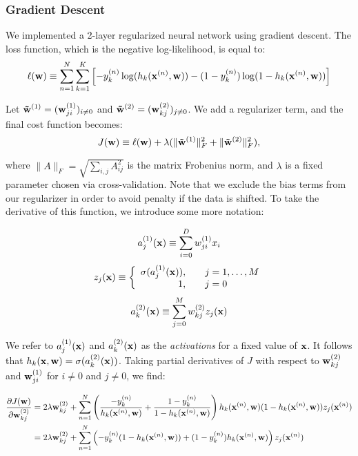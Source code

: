 \subsubsection{Gradient Descent}
We implemented a 2-layer regularized neural network using gradient descent.  The loss function, which is the negative log-likelihood, is equal to:
\begin{equation}
\ell(\boldsymbol{\mathbf{w}}) \equiv \sum_{n=1}^{N} \sum_{k=1}^{K} \left[ -y_k^{(n)} \log(h_{k}(\boldsymbol{\mathbf{x}}^{(n)}, \boldsymbol{\mathbf{w}})) - (1-y_k^{(n)}) \log(1 - h_{k}(\boldsymbol{\mathbf{x}}^{(n)}, \boldsymbol{\mathbf{w}}))\right]
\end{equation}

Let $\boldsymbol{\mathbf{\tilde w}}^{(1)} = (\boldsymbol{\mathbf{w}}^{(1)}_{ji})_{i \neq 0}$ and $\boldsymbol{\mathbf{\tilde w}}^{(2)} = (\boldsymbol{\mathbf{w}}^{(2)}_{kj})_{j \neq 0}$. We add a regularizer term, and the final cost function becomes:
\begin{equation}
J(\boldsymbol{\mathbf{w}}) \equiv \ell(\boldsymbol{\mathbf{w}}) + \lambda(\|\boldsymbol{\mathbf{\tilde w}}^{(1)}\|^2_F + \|\boldsymbol{\mathbf{\tilde w}}^{(2)}\|^2_F),
\end{equation}

where $\|A\|_F = \sqrt{\sum_{i,j} A^2_{ij}}$ is the matrix Frobenius norm, and $\lambda$ is a fixed parameter chosen via cross-validation.  Note that we exclude the bias terms from our regularizer in order to avoid penalty if the data is shifted.  To take the derivative of this function, we introduce some more notation:

\begin{equation}
a^{(1)}_j(\boldsymbol{\mathbf{x}}) \equiv \sum_{i=0}^D w_{ji}^{(1)} x_i
\end{equation}
\begin{equation}
z_j(\boldsymbol{\mathbf{x}}) \equiv \left\{\begin{array}{rl}
\sigma(a^{(1)}_j(\boldsymbol{\mathbf{x}})), & ~~~ j = 1,\ldots, M\\
1, & ~~~j = 0 \end{array} \right.
\end{equation}
\begin{equation}
a^{(2)}_k(\boldsymbol{\mathbf{x}}) \equiv \sum_{j=0}^M w_{kj}^{(2)} z_j(\boldsymbol{\mathbf{x}})
\end{equation}

We refer to $a^{(1)}_j(\boldsymbol{\mathbf{x}})$ and $a^{(2)}_k(\boldsymbol{\mathbf{x}})$ as the \emph{activations} for a fixed value of $\boldsymbol{\mathbf{x}}$.  It follows that $h_{k}(\boldsymbol{\mathbf{x}},\boldsymbol{\mathbf{w}}) = \sigma(a^{(2)}_k(\boldsymbol{\mathbf{x}}))$. Taking partial derivatives of $J$ with respect to $\boldsymbol{\mathbf{w}}^{(2)}_{kj}$ and $\boldsymbol{\mathbf{w}}^{(1)}_{ji}$ for $i \neq 0$ and $j \neq 0$, we find:  

\begin{align}
\frac{\partial J(\boldsymbol{\mathbf{w}})}{\partial \boldsymbol{\mathbf{w}}^{(2)}_{kj}} &= 2 \lambda \boldsymbol{\mathbf{w}}^{(2)}_{kj} + \sum_{n=1}^{N} \left(\frac{-y_k^{(n)}}{h_k(\boldsymbol{\mathbf{x}}^{(n)},\boldsymbol{\mathbf{w}})} +  \frac{1-y_k^{(n)}}{1 - h_k(\boldsymbol{\mathbf{x}}^{(n)},\boldsymbol{\mathbf{w}})}\right) h_k(\boldsymbol{\mathbf{x}}^{(n)},\boldsymbol{\mathbf{w}}) (1 - h_k(\boldsymbol{\mathbf{x}}^{(n)},\boldsymbol{\mathbf{w}})) z_j(\boldsymbol{\mathbf{x}}^{(n)})\\
&= 2 \lambda \boldsymbol{\mathbf{w}}^{(2)}_{kj} + \sum_{n=1}^{N} \left(-y_k^{(n)}(1 - h_k(\boldsymbol{\mathbf{x}}^{(n)},\boldsymbol{\mathbf{w}})) + (1-y_k^{(n)})h_k(\boldsymbol{\mathbf{x}}^{(n)},\boldsymbol{\mathbf{w}}) \right) z_j(\boldsymbol{\mathbf{x}}^{(n)})
\end{align}

